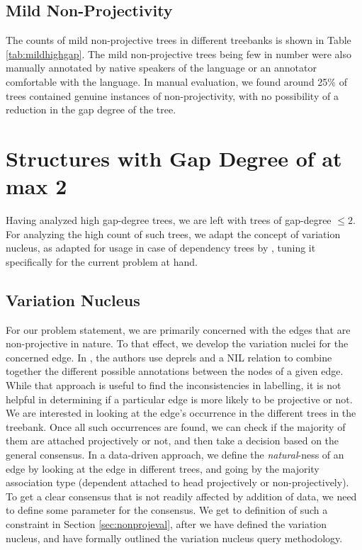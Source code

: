 \subsection{Mild Non-Projectivity}

The counts of mild non-projective trees in different treebanks is shown in Table \ref{tab:mildhighgap}. The mild non-projective trees being few in number were also manually annotated by native speakers of the language or an annotator comfortable with the language. In manual evaluation, we found around 25\% of trees contained genuine instances of non-projectivity, with no possibility of a reduction in the gap degree of the tree.

\section{Structures with Gap Degree of at max 2}
\label{sec:variation}

Having analyzed high gap-degree trees, we are left with trees of gap-degree \(\leq 2\). For analyzing the high count of such trees, we adapt the concept of variation nucleus, as adapted for usage in case of dependency trees by \cite{boyd}, tuning it specifically for the current problem at hand.

\subsection{Variation Nucleus}

For our problem statement, we are primarily concerned with the edges that are non-projective in nature. To that effect, we develop the variation nuclei for the concerned edge. In \cite{boyd}, the authors use deprels and a NIL relation to combine together the different possible annotations between the nodes of a given edge. While that approach is useful to find the inconsistencies in labelling, it is not helpful in determining if a particular edge is more likely to be projective or not. We are interested in looking at the edge's occurrence in the different trees in the treebank. Once all such occurrences are found, we can check if the majority of them are attached projectively or not, and then take a decision based on the general consensus. In a data-driven approach, we define the \textit{natural}-ness of an edge by looking at the edge in different trees, and going by the majority association type (dependent attached to head projectively or non-projectively). To get a clear consensus that is not readily affected by addition of data, we need to define some parameter for the consensus. We get to definition of such a constraint in Section \ref{sec:nonprojeval}, after we have defined the variation nucleus, and have formally outlined the variation nucleus query methodology.

